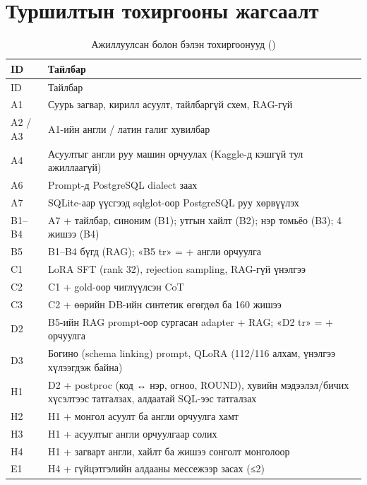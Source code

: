 
\chapter{Туршилтын тохиргооны жагсаалт}
\label{app:configs}

\begin{longtable}{p{1.8cm}p{12.2cm}}
\caption{Ажиллуулсан болон бэлэн тохиргоонууд ()}\label{tab:all-experiments}\\
\toprule
ID & Тайлбар \\
\midrule
\endfirsthead
\toprule
ID & Тайлбар \\
\midrule
\endhead
A1 & Суурь загвар, кирилл асуулт, тайлбаргүй схем, RAG-гүй \\
A2 / A3 & A1-ийн англи / латин галиг хувилбар \\
A4 & Асуултыг англи руу машин орчуулах (Kaggle-д кэшгүй тул ажиллаагүй) \\
A6 & Prompt-д PostgreSQL dialect заах \\
A7 & SQLite-аар үүсгээд sqlglot-оор PostgreSQL руу хөрвүүлэх \\
B1--B4 & A7 + тайлбар, синоним (B1); утгын хайлт (B2); нэр томьёо (B3); 4 жишээ (B4) \\
B5 & B1--B4 бүгд (RAG); «B5 tr» = + англи орчуулга \\
C1 & LoRA SFT (rank 32), rejection sampling, RAG-гүй үнэлгээ \\
C2 & C1 + gold-оор чиглүүлсэн CoT \\
C3 & C2 + өөрийн DB-ийн синтетик өгөгдөл ба 160 жишээ \\
D2 & B5-ийн RAG prompt-оор сургасан adapter + RAG; «D2 tr» = + орчуулга \\
D3 & Богино (schema linking) prompt, QLoRA (112/116 алхам, үнэлгээ хүлээгдэж байна) \\
H1 & D2 + postproc (код ↔ нэр, огноо, ROUND), хувийн мэдээлэл/бичих хүсэлтээс татгалзах, алдаатай SQL-ээс татгалзах \\
H2 & H1 + монгол асуулт ба англи орчуулга хамт \\
H3 & H1 + асуултыг англи орчуулгаар солих \\
H4 & H1 + загварт англи, хайлт ба жишээ сонголт монголоор \\
E1 & H4 + гүйцэтгэлийн алдааны мессежээр засах (≤2) \\

\end{longtable}
